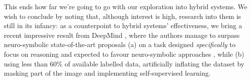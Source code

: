 \documentclass[../main.tex]{subfiles}
\begin{document}
This ends how far we're going to go with our exploration into hybrid systems. We wish to conclude by noting that, although interest is high, research into them is still in its infancy: as a counterpoint to hybrid systems' effectiveness, we bring a recent impressive result from DeepMind \parencite{dingObjectbasedAttentionSpatiotemporal2020}, where the authors manage to surpass neuro-symbolic state-of-the-art proposals (a) on a task designed \textit{specifically} to focus on reasoning and expected to favour neuro-symbolic approaches \parencite{yiCLEVRERCollisionEvents2019}, while (b) using less than 60\% of available labelled data, artificially inflating the dataset by masking part of the image and implementing self-supervised learning.
\end{document}
